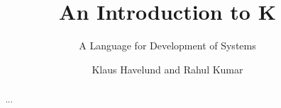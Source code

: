\documentclass{llncs}
\title{An Introduction to K}
\subtitle{A Language for Development of Systems}
\author{Klaus Havelund and Rahul Kumar}
\institute{
  Jet Propulsion Laboratory\\
  California Institute of Technology\\
  California, USA
}
\begin{document}
\maketitle

\begin{abstract}
...
\end{abstract}










\appendix
%
\end{document}
